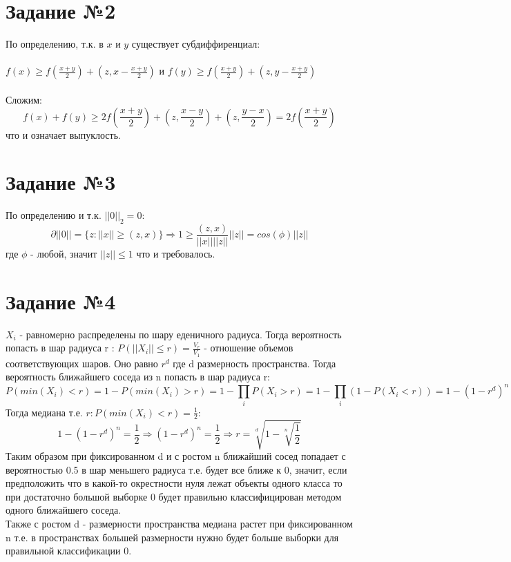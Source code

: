 \documentclass[12pt,a4paper,oneside]{scrartcl}
\begin{document}
\section{Задание №2}

По определению, т.к. в $x$ и $y$ существует субдиффиренциал: \\ \\ $f(x) \geq  f(\frac{x+y}{2}) + (z,x - \frac{x+y}{2})$ и $f(y) \geq  f(\frac{x+y}{2}) + (z,y - \frac{x+y}{2})$ \\ \\
Сложим:  $$f(x) + f(y) \geq 2f(\frac{x+y}{2}) + (z,\frac{x-y}{2}) + (z,\frac{y-x}{2}) = 2f(\frac{x+y}{2})$$ что и означает выпуклость.

\section{Задание №3}

По определению и т.к. $||0||_2 = 0 $:
$$\partial ||0|| = \{ z : ||x|| \geq (z,x)\} \Rightarrow 1 \geq \frac{(z,x)}{||x||||z||} ||z|| = cos(\phi)||z||$$
где $\phi$ - любой, значит $||z|| \leq 1 $ что и требовалось.

\section{Задание №4}

$ X_i $ - равномерно распределены по шару еденичного радиуса. Тогда вероятность попасть в шар радиуса r : $P(||X_i|| \leq r) = \frac{V_r}{V_1} $ - отношение объемов соответствующих шаров. Оно равно $r^d$ где d размерность пространства. Тогда вероятность ближайшего соседа из n попасть в шар радиуса r: 
 $$P(min(X_i) < r) = 1 - P(min(X_i) > r) = 1 - \prod_i P(X_i > r) = 1 - \prod_i(1 - P(X_i < r)) = 1 - (1 - r^d)^n$$
Тогда медиана т.е. $r : P(min(X_i) < r) = \frac{1}{2}$:
$$1 - (1 - r^d)^n = \frac{1}{2} \Rightarrow (1 - r^d)^n = \frac{1}{2} \Rightarrow r = \sqrt[d]{1 - \sqrt[n]{\frac{1}{2}}}$$
Таким образом при фиксированном d и с ростом n ближайший сосед попадает с вероятностью 0.5 в шар меньшего радиуса т.е. будет все ближе к 0, значит, если предположить что в какой-то окрестности нуля лежат объекты одного класса то при достаточно большой выборке 0 будет правильно классифицирован методом одного ближайшего соседа.
\\ 
Также с ростом d - размерности пространства медиана растет при фиксированном n т.е. в пространствах большей размерности нужно будет больше выборки для правильной классификации 0.
\end{document}

